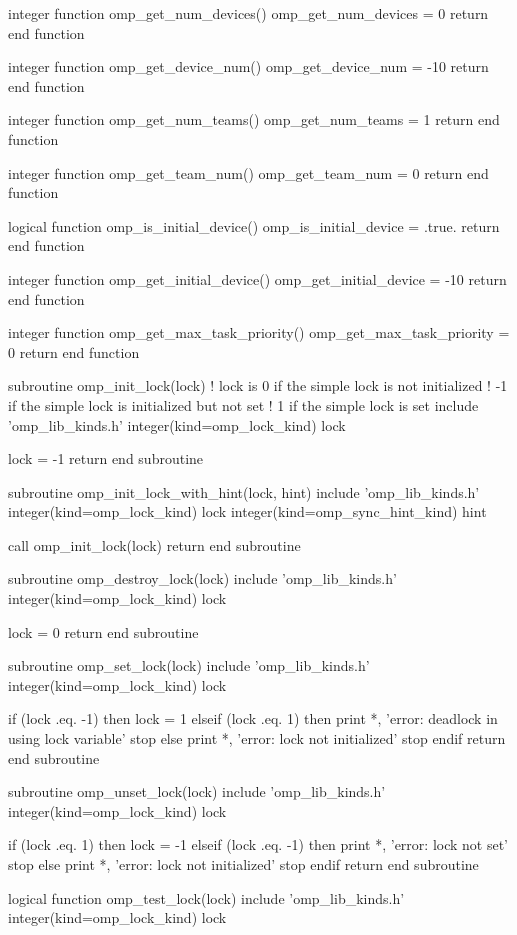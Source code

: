 {\begin{ompfFunction}
integer function omp_get_num_devices()
  omp_get_num_devices = 0
  return
end function

integer function omp_get_device_num()
  omp_get_device_num = -10
  return
end function

integer function omp_get_num_teams()
  omp_get_num_teams = 1
  return
end function

integer function omp_get_team_num()
  omp_get_team_num = 0
  return
end function

logical function omp_is_initial_device()
  omp_is_initial_device = .true.
  return
end function

integer function omp_get_initial_device()
  omp_get_initial_device = -10
  return
end function

integer function omp_get_max_task_priority()
  omp_get_max_task_priority = 0
  return
end function

subroutine omp_init_lock(lock)
  ! lock is 0 if the simple lock is not initialized
  !        -1 if the simple lock is initialized but not set
  !         1 if the simple lock is set
  include 'omp_lib_kinds.h'
  integer(kind=omp_lock_kind) lock

  lock = -1
  return
end subroutine

subroutine omp_init_lock_with_hint(lock, hint)
  include 'omp_lib_kinds.h'
  integer(kind=omp_lock_kind) lock
  integer(kind=omp_sync_hint_kind) hint

  call omp_init_lock(lock)
  return
end subroutine

subroutine omp_destroy_lock(lock)
  include 'omp_lib_kinds.h'
  integer(kind=omp_lock_kind) lock

  lock = 0
  return
end subroutine

subroutine omp_set_lock(lock)
  include 'omp_lib_kinds.h'
  integer(kind=omp_lock_kind) lock

  if (lock .eq. -1) then
    lock = 1
  elseif (lock .eq. 1) then
    print *, 'error: deadlock in using lock variable'
    stop
  else
    print *, 'error: lock not initialized'
    stop
  endif
  return
end subroutine

subroutine omp_unset_lock(lock)
  include 'omp_lib_kinds.h'
  integer(kind=omp_lock_kind) lock

  if (lock .eq. 1) then
    lock = -1
  elseif (lock .eq. -1) then
    print *, 'error: lock not set'
    stop
  else
    print *, 'error: lock not initialized'
    stop
  endif
  return
end subroutine

logical function omp_test_lock(lock)
  include 'omp_lib_kinds.h'
  integer(kind=omp_lock_kind) lock


\end{ompfFunction}}
